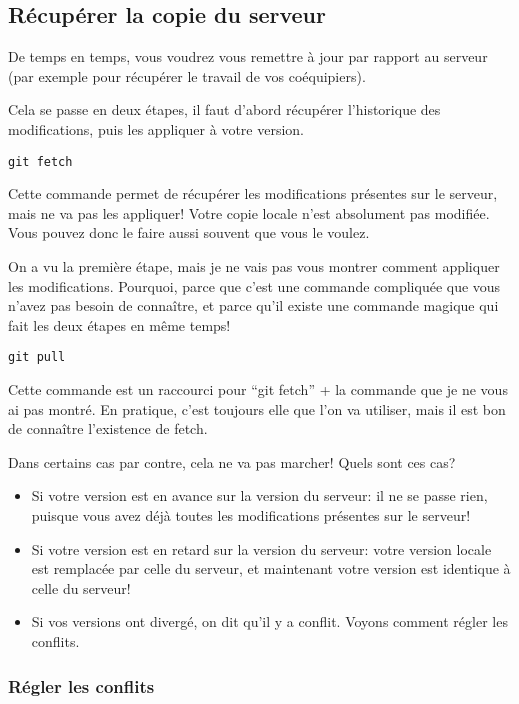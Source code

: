 \documentclass[10pt,a4paper]{article}
\begin{document}
\subsection{Récupérer la copie du serveur}

De temps en temps, vous voudrez vous remettre à jour par rapport au serveur (par exemple pour récupérer le travail de vos coéquipiers).

Cela se passe en deux étapes, il faut d'abord récupérer l'historique des modifications, puis les appliquer à votre version.

\begin{verbatim}
git fetch
\end{verbatim}

Cette commande permet de récupérer les modifications présentes sur le serveur, mais ne va pas les appliquer! Votre copie locale n'est absolument pas modifiée. Vous pouvez donc le faire aussi souvent que vous le voulez.

On a vu la première étape, mais je ne vais pas vous montrer comment appliquer les modifications. Pourquoi, parce que c'est une commande compliquée que vous n'avez pas besoin de connaître, et parce qu'il existe une commande magique qui fait les deux étapes en même temps!

\begin{verbatim}
git pull
\end{verbatim}

Cette commande est un raccourci pour ``git fetch'' + la commande que je ne vous ai pas montré. En pratique, c'est toujours elle que l'on va utiliser, mais il est bon de connaître l'existence de fetch.

Dans certains cas par contre, cela ne va pas marcher! Quels sont ces cas?

\begin{itemize}
\item Si votre version est en avance sur la version du serveur: il ne se passe rien, puisque vous avez déjà toutes les modifications présentes sur le serveur!
\item Si votre version est en retard sur la version du serveur: votre version locale est remplacée par celle du serveur, et maintenant votre version est identique à celle du serveur!
\item Si vos versions ont divergé, on dit qu'il y a conflit. Voyons comment régler les conflits.
\end{itemize}

\subsubsection{Régler les conflits\label{régler-conflits}}
\end{document}
